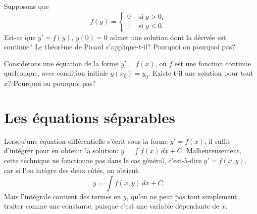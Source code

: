 \begin{exercise}[défi]
	Supposons que
	\begin{equation*}
		f(y) = \begin{cases}
				0 & \text{ si $y > 0$}, \\
				1 & \text{ si $y \leq 0$} .
				\end{cases}
	\end{equation*}
	Est-ce que $y' = f(y)$, $y(0) = 0$ admet une solution dont la dérivée est continue?
	Le théorème de Picard s'applique-t-il?  Pourquoi ou pourquoi pas?
\end{exercise}

\begin{exercise}
	Considérons une équation de la forme $y' = f(x)$, où $f$ est une fonction continue quelconque,
	avec condition initiale $y(x_0) = y_0$.  Existe-t-il une solution pour tout $x$?  Pourquoi ou pourquoi pas?
\end{exercise}


\sectionnewpage
\section{Les équations séparables}
\label{separable:section}


Lorsqu'une équation différentielle s'écrit sous la forme
$y' = f(x)$,
il suffit d'intégrer pour en obtenir la solution:
$y = \int f(x) \,dx + C$.
Malheureusement, cette technique ne fonctionne pas dans le cas général, c'est-à-dire
$y' = f(x , y)$, 
car si l'on intègre des deux côtés, on obtient:
\begin{equation*}
	y = \int f(x,y) \,dx + C .
\end{equation*}
Mais l'intégrale contient des termes en $y$, qu'on ne peut pas tout simplement \og{}traiter comme une constante\fg{}, puisque c'est une variable dépendante de $x$.


